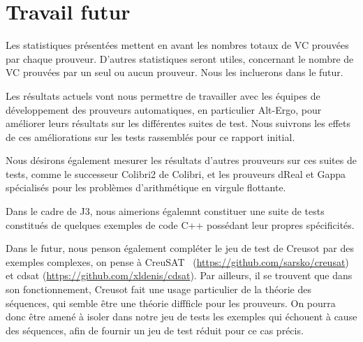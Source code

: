 \documentclass[a4paper,11pt]{article}
\begin{document}
\section{Travail futur}

Les statistiques présentées mettent en avant les nombres totaux de VC prouvées
par chaque prouveur. D'autres statistiques seront utiles, concernant le nombre
de VC prouvées par un seul ou aucun prouveur. Nous les incluerons dans le futur.

Les résultats actuels vont nous permettre de travailler avec les équipes de
développement des prouveurs automatiques, en particulier Alt-Ergo, pour
améliorer leurs résultats sur les différentes suites de test. Nous suivrons les
effets de ces améliorations sur les tests rassemblés pour ce rapport initial.

Nous désirons également mesurer les résultats d'autres prouveurs sur ces suites
de tests, comme le successeur Colibri2 de Colibri, et les prouveurs dReal et
Gappa spécialisés pour les problèmes d'arithmétique en virgule flottante.

Dans le cadre de J3, nous aimerions égalemnt constituer une suite de tests
constitués de quelques exemples de code C++ possédant leur propres spécificités.

Dans le futur, nous penson également compléter le jeu de test de
Creusot par des exemples complexes, on pense à CreuSAT~\cite{skotam22creusat}
(\url{https://github.com/sarsko/creusat}) et cdsat
(\url{https://github.com/xldenis/cdsat}). Par ailleurs, il se trouvent
que dans son fonctionnement, Creusot fait une usage particulier de la
théorie des séquences, qui semble être une théorie diffficle pour les
prouveurs. On pourra donc être amené à isoler dans notre jeu de tests
les exemples qui échouent à cause des séquences, afin de fournir un
jeu de test réduit pour ce cas précis.

\clearpage



%
\end{document}
